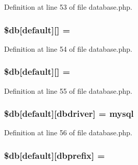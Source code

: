 Definition at line 53 of file database.\+php.

\subsubsection[{\texorpdfstring{\$db}{$db}}]{\setlength{\rightskip}{0pt plus 5cm}\$db\mbox{[}\textquotesingle{}default\textquotesingle{}\mbox{]}\mbox{[}\textquotesingle{}\mbox{]} = \textquotesingle{}\textquotesingle{}}\hypertarget{database_8php_a1f6afce218438d9f7d13e28ee602e29b}{}\label{database_8php_a1f6afce218438d9f7d13e28ee602e29b}


Definition at line 54 of file database.\+php.

\subsubsection[{\texorpdfstring{\$db}{$db}}]{\setlength{\rightskip}{0pt plus 5cm}\$db\mbox{[}\textquotesingle{}default\textquotesingle{}\mbox{]}\mbox{[}\textquotesingle{}\mbox{]} = \textquotesingle{}\textquotesingle{}}\hypertarget{database_8php_a87e73e2a5365d1ee95a673b551238fef}{}\label{database_8php_a87e73e2a5365d1ee95a673b551238fef}


Definition at line 55 of file database.\+php.

\subsubsection[{\texorpdfstring{\$db}{$db}}]{\setlength{\rightskip}{0pt plus 5cm}\$db\mbox{[}\textquotesingle{}default\textquotesingle{}\mbox{]}\mbox{[}\textquotesingle{}dbdriver\textquotesingle{}\mbox{]} = \textquotesingle{}mysql\textquotesingle{}}\hypertarget{database_8php_a9f97429a3096d60fa26291b35f6cb7a9}{}\label{database_8php_a9f97429a3096d60fa26291b35f6cb7a9}


Definition at line 56 of file database.\+php.

\subsubsection[{\texorpdfstring{\$db}{$db}}]{\setlength{\rightskip}{0pt plus 5cm}\$db\mbox{[}\textquotesingle{}default\textquotesingle{}\mbox{]}\mbox{[}\textquotesingle{}dbprefix\textquotesingle{}\mbox{]} = \textquotesingle{}\textquotesingle{}}\hypertarget{database_8php_ae0a3c1b4e2a1907dc70671ee97901456}{}\label{database_8php_ae0a3c1b4e2a1907dc70671ee97901456}


